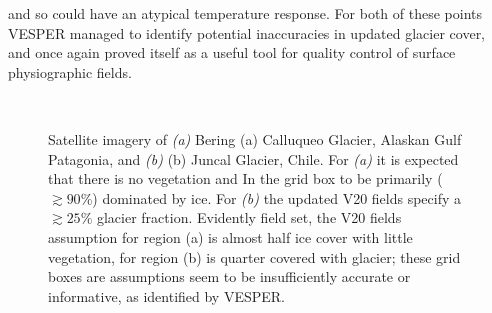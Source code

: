 \documentclass[hess, twostagejnl]{copernicus}
\providecommand{\DIFadd}[1]{{\protect\color{blue} \sf #1}} %
\providecommand{\DIFdel}[1]{{\protect\color{red} \scriptsize #1}} %
\providecommand{\DIFaddbegin}{} %
\providecommand{\DIFaddend}{} %
\providecommand{\DIFdelend}{} %
\providecommand{\DIFaddFL}[1]{\DIFadd{#1}} %
\providecommand{\DIFdelFL}[1]{\DIFdel{#1}} %
\providecommand{\DIFaddbeginFL}{} %
\providecommand{\DIFaddendFL}{} %
\providecommand{\DIFdelbeginFL}{} %
\providecommand{\DIFdelendFL}{} %
\begin{document}
\DIFdelend \DIFaddbegin \DIFadd{and so could have an atypical temperature response. For both of these points VESPER managed  to identify potential inaccuracies in updated glacier cover, and once again proved itself as a useful tool for quality control of surface physiographic fields. 
	}\DIFaddend \begin{figure}[h!]
	\DIFdelbeginFL %
\DIFdelendFL \DIFaddbeginFL {} \DIFaddendFL \\
	\caption{Satellite imagery of \DIFdelbeginFL \DIFdelFL{\textit{(a)} Bering }\DIFdelendFL \DIFaddbeginFL \DIFaddFL{(a) Calluqueo }\DIFaddendFL Glacier, \DIFdelbeginFL \DIFdelFL{Alaskan Gulf}\DIFdelendFL \DIFaddbeginFL \DIFaddFL{Patagonia}\DIFaddendFL , and \DIFdelbeginFL \DIFdelFL{\textit{(b)} }\DIFdelendFL \DIFaddbeginFL \DIFaddFL{(b) }\DIFaddendFL Juncal Glacier, Chile. \DIFdelbeginFL \DIFdelFL{For \textit{(a)} it is expected that there is no vegetation and }\DIFdelendFL \DIFaddbeginFL \DIFaddFL{In }\DIFaddendFL the \DIFdelbeginFL \DIFdelFL{grid box to be primarily ($\gtrsim 90 \%$) dominated by ice. For \textit{(b)} the }\DIFdelendFL updated V20 \DIFdelbeginFL \DIFdelFL{fields specify a $\gtrsim 25 \%$  glacier fraction. Evidently}\DIFdelendFL \DIFaddbeginFL \DIFaddFL{field set}\DIFaddendFL , the \DIFdelbeginFL \DIFdelFL{V20 fields }\DIFdelendFL \DIFaddbeginFL \DIFaddFL{assumption }\DIFaddendFL for \DIFaddbeginFL \DIFaddFL{region (a) is almost half ice cover with little vegetation, for region (b) is quarter covered with glacier; }\DIFaddendFL these \DIFdelbeginFL \DIFdelFL{grid boxes are }\DIFdelendFL \DIFaddbeginFL \DIFaddFL{assumptions seem to be }\DIFaddendFL insufficiently accurate or informative, as identified by VESPER.
	} 
	\label{fig:glacier}
\end{figure}
\end{document}
